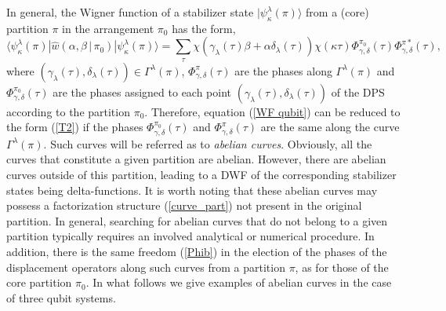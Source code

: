 \documentclass{article}
\begin{document}
In general, the Wigner function of a stabilizer state
$|\psi_{\kappa}^{\lambda}(\pi)\rangle$ from a (core) partition $\pi$ in
the arrangement $\pi_{0}$ has the form, 
\begin{equation}
  \langle \psi_{\kappa}^{\lambda}(\pi)
  |\hat{w}\left(\alpha,\beta \, | \, \pi_{0}\right)
  |\psi_{\kappa}^{\lambda}(\pi)\rangle
  = \sum_{\tau} \chi\left(
    \gamma_{\lambda} (\tau) \beta + \alpha \delta_{\lambda}(\tau)
  \right) \chi(\kappa \tau)
  \Phi_{\gamma,\delta}^{\pi_{0}}(\tau)
  \Phi_{\gamma,\delta }^{\pi \ast}(\tau),
  \label{WF qubit}
\end{equation}
where $\left(\gamma_{\lambda}(\tau),\delta_{\lambda}(\tau)\right) \in
\Gamma^{\lambda}(\pi)$, $\Phi_{\gamma,\delta }^{\pi}(\tau)$ are the phases along
$\Gamma^{\lambda}(\pi)$ and $\Phi_{\gamma,\delta}^{\pi_{0}}(\tau)$ are the
phases assigned to each point
$\left(\gamma_{\lambda}(\tau),\delta_{\lambda}(\tau )\right)$ of the DPS
according to the partition $\pi_{0}$. Therefore, equation (\ref{WF qubit}) can
be reduced to the form (\ref{T2}) if the phases
$\Phi_{\gamma,\delta}^{\pi_{0}}(\tau)$ and $\Phi_{\gamma,\delta }^{\pi}(\tau)$
are the same along the curve $\Gamma^{\lambda}(\pi)$. Such curves will be
referred as to \textit{abelian curves}. Obviously, all the curves that
constitute a given partition are abelian. However, there are abelian curves
outside of this partition, leading to a DWF of the corresponding stabilizer
states being delta-functions.  It is worth noting that these abelian curves may
possess a factorization structure (\ref{curve_part}) not present in the original
partition. In general, searching for abelian curves that do not belong to a
given partition typically requires an involved analytical or numerical
procedure.  In addition, there is the same freedom (\ref{Phib}) in the election
of the phases of the displacement operators along such curves from a partition
$\pi$, as for those of the core partition $\pi_{0}$. In what follows we give
examples of abelian curves in the case of three qubit systems.
\end{document}
